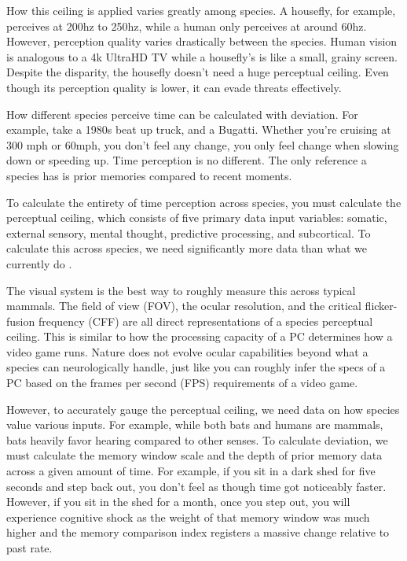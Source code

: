 \documentclass[11pt,a4paper]{article}
\begin{document}
How this ceiling is applied varies greatly among species. A housefly, for example, perceives at 200hz to 250hz, while a human only perceives at around 60hz. However, perception quality varies drastically between the species. Human vision is analogous to a 4k UltraHD TV while a housefly’s is like a small, grainy screen. Despite the disparity, the housefly doesn't need a huge perceptual ceiling. Even though its perception quality is lower, it can evade threats effectively.

How different species perceive time can be calculated with deviation. For example, take a 1980s beat up truck, and a Bugatti. Whether you’re cruising at 300 mph or 60mph, you don't feel any change, you only feel change when  slowing down or speeding up. Time perception is no different. The only reference a species has is prior memories compared to recent moments.

To calculate the entirety of time perception across species, you must calculate the perceptual ceiling, which consists of five primary data input variables: somatic, external sensory, mental thought, predictive processing, and subcortical. To calculate this across species, we need significantly more data than what we currently do \citep{healy2013metabolic}.

The visual system is the best way to roughly measure this across typical mammals. The field of view (FOV), the ocular resolution, and the critical flicker-fusion frequency (CFF) are all direct representations of a species perceptual ceiling. This is similar to how the processing capacity of a PC determines how a video game runs. Nature does not evolve ocular capabilities beyond what a species can neurologically handle, just like you can roughly infer the specs of a PC based on the frames per second (FPS) requirements of a video game.

However, to accurately gauge the perceptual ceiling, we need data on how species value various inputs. For example, while both bats and humans are mammals, bats heavily favor hearing compared to other senses. To calculate deviation, we must calculate the memory window scale and the depth of prior memory data across a given amount of time. For example, if you sit in a dark shed for five seconds and step back out, you don't feel as though time got noticeably faster. However, if you sit in the shed for a month, once you step out, you will experience cognitive shock as the weight of that memory window was much higher and the memory comparison index registers a massive change relative to past rate.
\end{document}
